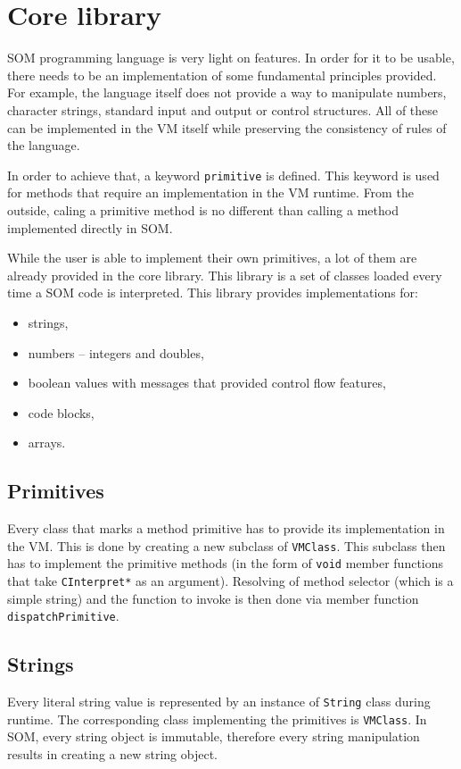 \documentclass[thesis=M,english]{FITthesis}[2019/12/23]
\begin{document}
\section{Core library}
SOM programming language is very light on features. In order for it to be usable, there needs to be an implementation of some fundamental principles provided.
For example, the language itself does not provide a way to manipulate numbers, character strings, standard input and output or control structures. All of these
can be implemented in the VM itself while preserving the consistency of rules of the language.

In order to achieve that, a keyword \texttt{primitive} is defined. This keyword is used for methods that require an implementation in the VM runtime. From the outside,
caling a primitive method is no different than calling a method implemented directly in SOM.

While the user is able to implement their own primitives, a lot of them are already provided in the core library. This library is a set of classes loaded every time
a SOM code is interpreted. This library provides implementations for:
\begin{itemize}
	\item strings,
	\item numbers -- integers and doubles,
	\item boolean values with messages that provided control flow features,
	\item code blocks,
	\item arrays.
\end{itemize}

\subsection{Primitives}
\label{subsection:primitives}
Every class that marks a method primitive has to provide its implementation in the VM. This is done by creating a new subclass of \texttt{VMClass}. This subclass
then has to implement the primitive methods (in the form of \texttt{void} member functions that take \texttt{CInterpret*} as an argument). Resolving of method
selector (which is a simple string) and the function to invoke is then done via member function \texttt{dispatchPrimitive}.

\subsection{Strings}
Every literal string value is represented by an instance of \texttt{String} class during runtime. The corresponding class implementing the primitives is
\texttt{VMClass}. In SOM, every string object is immutable, therefore every string manipulation results in creating a new string object.
\end{document}
